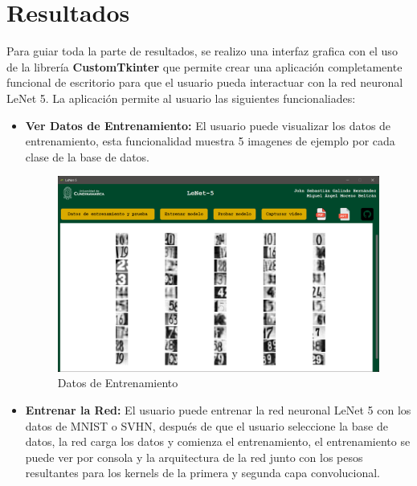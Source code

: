 \section{Resultados}
Para guiar toda la parte de resultados, se realizo una interfaz grafica con el uso de la librería
\textbf{CustomTkinter} que permite crear una aplicación completamente funcional de escritorio para 
que el usuario pueda interactuar con la red neuronal LeNet 5. La aplicación permite al usuario
las siguientes funcionaliades:

\begin{itemize}
    \item \textbf{Ver Datos de Entrenamiento:} El usuario puede visualizar los datos de entrenamiento, 
    esta funcionalidad muestra 5 imagenes de ejemplo por cada clase de la base de datos.

    \begin{figure}[htbp]
        \centering
        \includegraphics[width=\linewidth]{src/figures/info_function.png}
        \caption{Datos de Entrenamiento}
        \label{fig:TrainingData}
    \end{figure}

    \item \textbf{Entrenar la Red:} El usuario puede entrenar la red neuronal LeNet 5 con los datos de
    MNIST o SVHN, después de que el usuario seleccione la base de datos, la red carga los datos y 
    comienza el entrenamiento, el entrenamiento se puede ver por consola y la arquitectura de la red
    junto con los pesos resultantes para los kernels de la primera y segunda capa convolucional.


\end{itemize}

